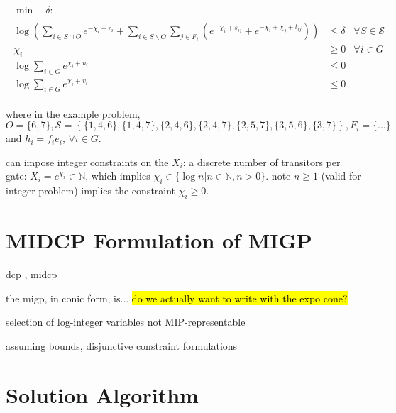 \documentclass[]{article}
\begin{document}
\begin{subequations}
\begin{gather}
\begin{align}
\min \quad \delta :
\end{align}
\\
\begin{align}
\log \left( \sum_{i \in S \cap O} e^{-\chi_i + r_i} + \sum_{i \in S \backslash O} \sum_{j \in F_i} \left(  e^{-\chi_i + s_{ij}} + e^{-\chi_i +\chi_j + t_{ij}} \right) \right)
& \leq \delta
& \forall S \in \mathcal{S}
\\
\chi_i
& \geq 0
& \forall i \in G
\\
\log \sum_{i \in G} e^{\chi_i + u_i}
& \leq 0
\\
\log \sum_{i \in G} e^{\chi_i + v_i}
& \leq 0
\end{align}
\end{gather}
\end{subequations}



where in the example problem, $O = \{6,7\}, \mathcal{S} = \left\{ \{1,4,6\}, \{1,4,7\}, \{2,4,6\}, \{2,4,7\}, \{2,5,7\}, \{3,5,6\}, \{3,7\} \right\}, F_i = \{...\}$ and $h_i = f_i e_i$, $\forall i \in G$.


can impose integer constraints on the $X_i$: a discrete number of transitors per gate: $X_i = e^{\chi_i} \in \mathbb{N}$, which implies $\chi_i \in \{ \log n \vert n \in \mathbb{N}, n > 0 \}$. note $n \geq 1$ (valid for integer problem) implies the constraint $\chi_i \geq 0$.



\section{MIDCP Formulation of MIGP}

dcp \cite{boyd06}, midcp \cite{lubin15}


the migp, in conic form, is... \hl{do we actually want to write with the expo cone?}



selection of log-integer variables not MIP-representable

assuming bounds, disjunctive constraint formulations



\section{Solution Algorithm}
\end{document}
